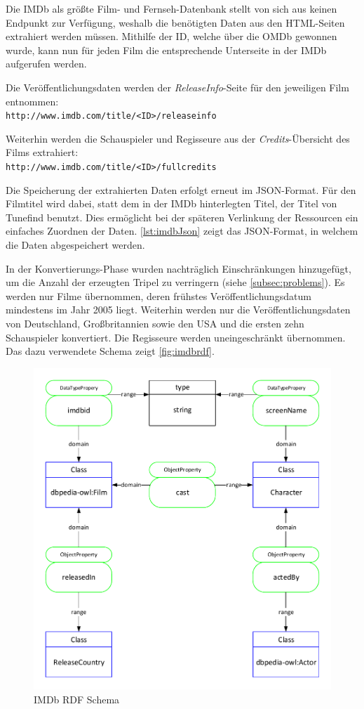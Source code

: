 \documentclass[parskip]{scrartcl}
\begin{document}
Die IMDb als größte Film- und Fernseh-Datenbank stellt von sich aus keinen Endpunkt zur Verfügung, weshalb die benötigten Daten aus den HTML-Seiten extrahiert werden müssen. Mithilfe der ID, welche über die OMDb gewonnen wurde, kann nun für jeden Film die entsprechende Unterseite in der IMDb aufgerufen werden.

Die Veröffentlichungsdaten werden der \textit{ReleaseInfo}-Seite für den jeweiligen Film entnommen:\\
\texttt{http://www.imdb.com/title/<ID>/releaseinfo}

Weiterhin werden die Schauspieler und Regisseure aus der \textit{Credits}-Übersicht des Films extrahiert:\\
\texttt{http://www.imdb.com/title/<ID>/fullcredits}

Die Speicherung der extrahierten Daten erfolgt erneut im JSON-Format. Für den Filmtitel wird dabei, statt dem in der IMDb hinterlegten Titel, der Titel von Tunefind benutzt. Dies ermöglicht bei der späteren Verlinkung der Ressourcen ein einfaches Zuordnen der Daten. \autoref{lst:imdbJson} zeigt das JSON-Format, in welchem die Daten abgespeichert werden.

In der Konvertierungs-Phase wurden nachträglich Einschränkungen hinzugefügt, um die Anzahl der erzeugten Tripel zu verringern (siehe \ref{subsec:problems}). Es werden nur Filme übernommen, deren frühstes Veröffentlichungsdatum mindestens im Jahr 2005 liegt. Weiterhin werden nur die Veröffentlichungsdaten von Deutschland, Großbritannien sowie den USA und die ersten zehn Schauspieler konvertiert. Die Regisseure werden uneingeschränkt übernommen. Das dazu verwendete Schema zeigt \autoref{fig:imdbrdf}.

\begin{figure}[H]
    \centering
    \caption{IMDb RDF Schema}
    \label{fig:imdbrdf}
    \includegraphics[scale=0.8]{imdb}
\end{figure}
\end{document}
